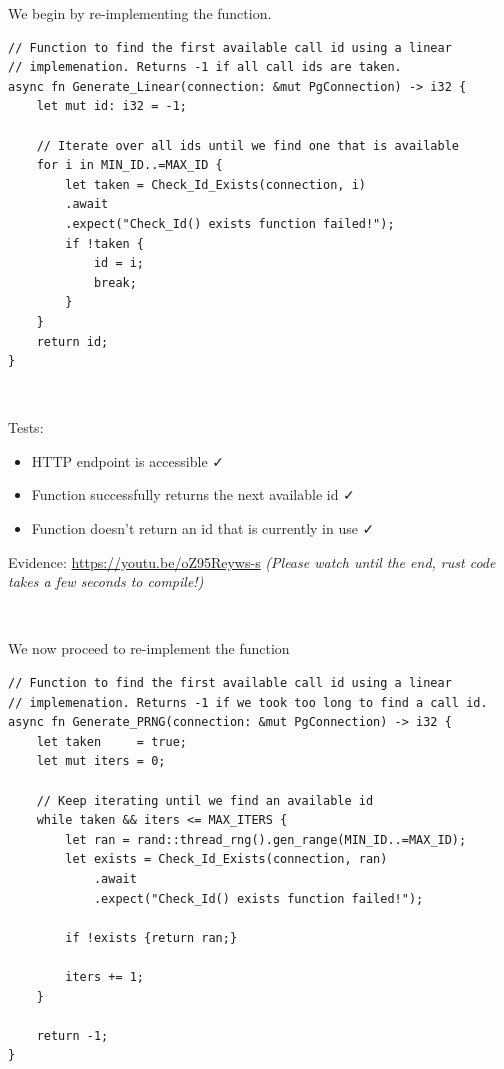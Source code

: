 We begin by re-implementing the 
function.

\begin{verbatim}
// Function to find the first available call id using a linear
// implemenation. Returns -1 if all call ids are taken.
async fn Generate_Linear(connection: &mut PgConnection) -> i32 {
    let mut id: i32 = -1;

    // Iterate over all ids until we find one that is available
    for i in MIN_ID..=MAX_ID {
        let taken = Check_Id_Exists(connection, i)
	    .await
	    .expect("Check_Id() exists function failed!");
        if !taken {
            id = i;
            break;
        }
    }
    return id;
}
\end{verbatim}

{\color{gray} \hrulefill} \\ \vspace{0.2cm}

{\sffamily Tests:}

\begin{itemize}
\item HTTP endpoint is accessible \faCheck \\
\item Function successfully returns the next available id \faCheck \\
\item Function doesn't return an id that is currently in use \faCheck \\
\end{itemize}

{\sffamily Evidence:} \url{https://youtu.be/oZ95Reyws-s}
\textit{(Please watch until the end, rust code takes a
few seconds to compile!)}

{\color{gray} \hrulefill} \\ \vspace{0.2cm}

We now proceed to re-implement the  function

\begin{verbatim}
// Function to find the first available call id using a linear
// implemenation. Returns -1 if we took too long to find a call id.
async fn Generate_PRNG(connection: &mut PgConnection) -> i32 {
    let taken     = true;
    let mut iters = 0;

    // Keep iterating until we find an available id
    while taken && iters <= MAX_ITERS {
        let ran = rand::thread_rng().gen_range(MIN_ID..=MAX_ID);
        let exists = Check_Id_Exists(connection, ran)
            .await
            .expect("Check_Id() exists function failed!");

        if !exists {return ran;}

        iters += 1;
    }

    return -1;
}
\end{verbatim}

